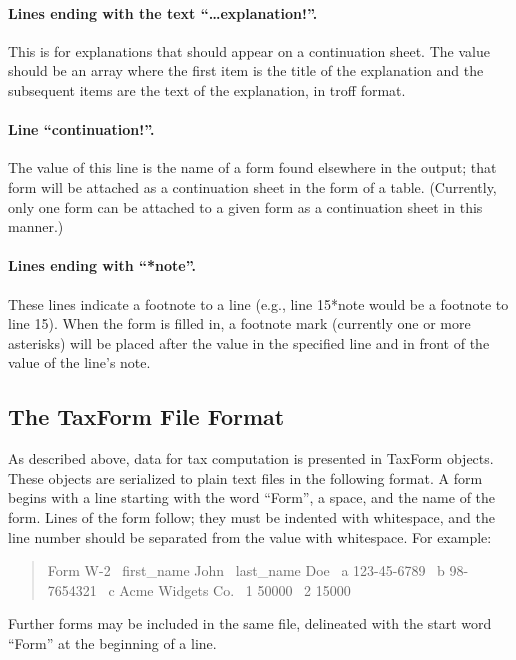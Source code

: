 \paragraph{Lines ending with the text ``\ldots explanation!''.} This is for
explanations that should appear on a continuation sheet. The value should be an
array where the first item is the title of the explanation and the subsequent
items are the text of the explanation, in troff format.

\paragraph{Line ``continuation!''.} The value of this line is the name of a form
found elsewhere in the output; that form will be attached as a continuation
sheet in the form of a table. (Currently, only one form can be attached to a
given form as a continuation sheet in this manner.)

\paragraph{Lines ending with ``*note''.} These lines indicate a footnote to a
line (e.g., line 15*note would be a footnote to line 15). When the form is
filled in, a footnote mark (currently one or more asterisks) will be placed
after the value in the specified line and in front of the value of the line's
note.



\subsection{The TaxForm File Format}

As described above, data for tax computation is presented in TaxForm objects.
These objects are serialized to plain text files in the following format.
A form begins with a line starting with the word ``Form'', a space, and the
name of the form. Lines of the form follow; they must be indented with
whitespace, and the line number should be separated from the value with
whitespace. For example:
\begin{quote}
\ttfamily\obeylines\obeyspaces
Form W-2
\     first\_name          John
\     last\_name           Doe
\     a                   123-45-6789
\     b                   98-7654321
\     c                   Acme Widgets Co.
\     1                   50000
\     2                   15000
\end{quote}
Further forms may be included in the same file, delineated with the start word
``Form'' at the beginning of a line.

